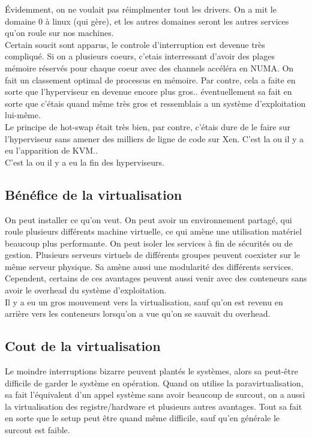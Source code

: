 \documentclass[oneside]{book}
\begin{document}
Évidemment, on ne voulait pas réimplmenter tout les drivers. On a mit le domaine 0 à linux (qui gère), et les autres domaines seront les autres services qu'on roule sur nos machines. \\

Certain soucit sont apparus, le controle d'interruption est devenue très compliqué. Si on a plusieurs coeurs, c'etais interressant d'avoir des plages mémoire réservés pour chaque coeur avec des channels accéléra en NUMA. On fait un classement optimal de processus en mémoire. Par contre, cela a faite en sorte que l'hyperviseur en devenue encore plus gros.. éventuellement sa fait en sorte que c'étais quand même très gros et ressemblais a un système d'exploitation lui-même.\\

Le principe de hot-swap était très bien, par contre, c'étais dure de le faire sur l'hyperviseur sans amener des milliers de ligne de code sur Xen. C'est la ou il y a eu l'apparition de KVM..\\

C'est la ou il y a eu la fin des hyperviseurs.

\subsection{Bénéfice de la virtualisation}
On peut installer ce qu'on veut. On peut avoir un environnement partagé, qui roule plusieurs différents machine virtuelle, ce qui amène une utilisation matériel beaucoup plus performante.  On peut isoler les services à fin de sécurités ou de gestion. Plusieurs serveurs virtuels de différents groupes peuvent coexister sur le même serveur physique. Sa amène aussi une modularité des différents services. Cependent, certains de ces avantages peuvent aussi venir avec des conteneurs sans avoir le overhead du système d'exploitation.\\

Il y a eu un gros mouvement vers la virtualisation, sauf qu'on est revenu en arrière vers les conteneurs lorsqu'on a vue qu'on se sauvait du overhead.

\subsection{Cout de la virtualisation}
Le moindre interruptions bizarre peuvent plantés le systèmes, alors sa peut-être difficile de garder le système en opération. Quand on utilise la paravirtualisation, sa fait l'équivalent d'un appel système sans avoir beaucoup de surcout, on a aussi la virtualisation des registre/hardware et plusieurs autres avantages. Tout sa fait en sorte que le setup peut être quand même difficile, sauf qu'en générale le surcout est faible.\\
\end{document}
